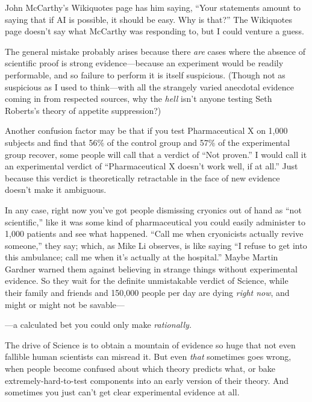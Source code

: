 {
 John McCarthy's Wikiquotes page has him saying,
``Your statements amount to saying that if AI is
possible, it should be easy. Why is
that?'' The Wikiquotes page
doesn't say what McCarthy was responding to, but I
could venture a guess.}

{
 The general mistake probably arises because there \textit{are}
cases where the absence of scientific proof is strong
evidence---because an experiment would be readily performable, and so
failure to perform it is itself suspicious. (Though not as suspicious
as I used to think---with all the strangely varied anecdotal evidence
coming in from respected sources, why the \textit{hell}
isn't anyone testing Seth Roberts's
theory of appetite suppression?)}

{
 Another confusion factor may be that if you test Pharmaceutical X
on 1,000 subjects and find that 56\% of the control group and 57\% of
the experimental group recover, some people will call that a verdict of
``Not proven.'' I would call it an
experimental verdict of ``Pharmaceutical X
doesn't work well, if at all.'' Just
because this verdict is theoretically retractable in the face of new
evidence doesn't make it ambiguous.}

{
 In any case, right now you've got people
dismissing cryonics out of hand as ``not
scientific,'' like it was some kind of pharmaceutical
you could easily administer to 1,000 patients and see what happened.
``Call me when cryonicists actually revive
someone,'' they say; which, as Mike Li observes, is
like saying ``I refuse to get into this ambulance;
call me when it's actually at the
hospital.'' Maybe Martin Gardner warned them against
believing in strange things without experimental evidence. So they wait
for the definite unmistakable verdict of Science, while their family
and friends and 150,000 people per day are dying \textit{right now},
and might or might not be savable---}

{
 {}---a calculated bet you could only make \textit{rationally.}}

{
 The drive of Science is to obtain a mountain of evidence so huge
that not even fallible human scientists can misread it. But even
\textit{that} sometimes goes wrong, when people become confused about
which theory predicts what, or bake extremely-hard-to-test components
into an early version of their theory. And sometimes you just
can't get clear experimental evidence at all.}

